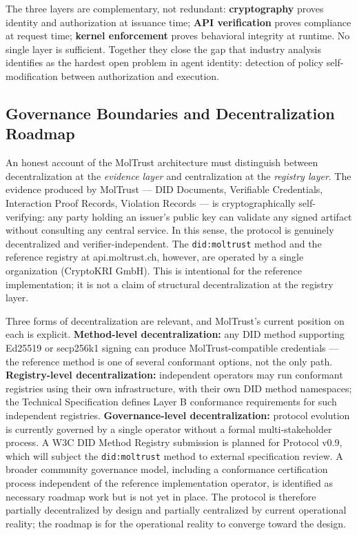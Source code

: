 The three layers are complementary, not redundant: \textbf{cryptography} proves identity and authorization at issuance time; \textbf{API verification} proves compliance at request time; \textbf{kernel enforcement} proves behavioral integrity at runtime. No single layer is sufficient. Together they close the gap that industry analysis identifies as the hardest open problem in agent identity: detection of policy self-modification between authorization and execution.


\subsection{Governance Boundaries and Decentralization Roadmap}

An honest account of the MolTrust architecture must distinguish between decentralization at the \textit{evidence layer} and centralization at the \textit{registry layer}. The evidence produced by MolTrust — DID Documents, Verifiable Credentials, Interaction Proof Records, Violation Records — is cryptographically self-verifying: any party holding an issuer's public key can validate any signed artifact without consulting any central service. In this sense, the protocol is genuinely decentralized and verifier-independent. The \texttt{did:moltrust} method and the reference registry at api.moltrust.ch, however, are operated by a single organization (CryptoKRI GmbH). This is intentional for the reference implementation; it is not a claim of structural decentralization at the registry layer.


Three forms of decentralization are relevant, and MolTrust's current position on each is explicit. \textbf{Method-level decentralization:} any DID method supporting Ed25519 or secp256k1 signing can produce MolTrust-compatible credentials — the reference method is one of several conformant options, not the only path. \textbf{Registry-level decentralization:} independent operators may run conformant registries using their own infrastructure, with their own DID method namespaces; the Technical Specification \cite{ref28_techspec} defines Layer B conformance requirements for such independent registries. \textbf{Governance-level decentralization:} protocol evolution is currently governed by a single operator without a formal multi-stakeholder process. A W3C DID Method Registry submission is planned for Protocol v0.9, which will subject the \texttt{did:moltrust} method to external specification review. A broader community governance model, including a conformance certification process independent of the reference implementation operator, is identified as necessary roadmap work but is not yet in place. The protocol is therefore partially decentralized by design and partially centralized by current operational reality; the roadmap is for the operational reality to converge toward the design.


